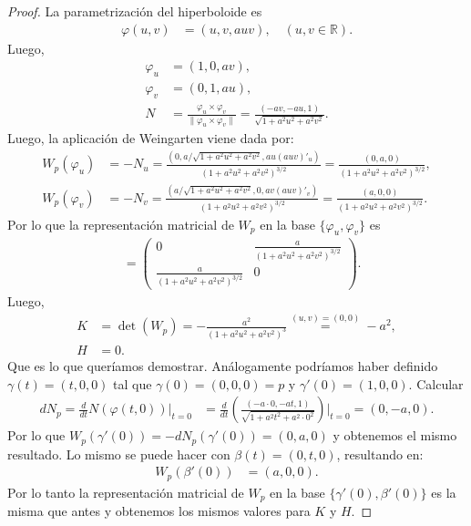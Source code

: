 \documentclass{article}
\newcommand{\R}{\mathbb{R}}
\begin{document}
\begin{proof}
    La parametrización del hiperboloide es \begin{align*}
        \varphi(u, v) & = (u, v, auv), \quad (u, v \in \R).
    \end{align*}
    Luego, \begin{align*}
        \varphi_u & = (1, 0, av),                                                                                                           \\
        \varphi_v & = (0, 1, au),                                                                                                           \\
        N         & = \frac{\varphi_u \times \varphi_v}{\|\varphi_u \times \varphi_v\|} = \frac{(-av, -au, 1)}{\sqrt{1 + a^2u^2 + a^2v^2}}.
    \end{align*}
    Luego, la aplicación de Weingarten viene dada por: \begin{align*}
        W_p(\varphi_u) & = -N_u = \frac{(0, a/\sqrt{1 + a^2u^2 + a^2v^2}, au(auv)'_u)}{(1 + a^2u^2 + a^2v^2)^{3/2}} = \frac{(0, a, 0)}{{(1 + a^2u^2 + a^2v^2)}^{3/2}}, \\
        W_p(\varphi_v) & = -N_v = \frac{(a/\sqrt{1 + a^2u^2 + a^2v^2}, 0, av(auv)'_v)}{(1 + a^2u^2 + a^2v^2)^{3/2}} = \frac{(a, 0, 0)}{{(1 + a^2u^2 + a^2v^2)}^{3/2}}.
    \end{align*}
    Por lo que la representación matricial de \( W_p \) en la base \( \{\varphi_u, \varphi_v\} \) es \begin{align*}
        [W_p] & = \begin{pmatrix}
                      0                                       & \frac{a}{{(1 + a^2u^2 + a^2v^2)}^{3/2}} \\
                      \frac{a}{{(1 + a^2u^2 + a^2v^2)}^{3/2}} & 0
                  \end{pmatrix}.
    \end{align*}
    Luego, \begin{align*}
        K & = \det(W_p) = -\frac{a^2}{{(1 + a^2u^2 + a^2v^2)}^{3}} \stackrel{(u,v)=(0,0)}{=} -a^2, \\
        H & = 0.
    \end{align*}
    Que es lo que queríamos demostrar. Análogamente podríamos haber definido \( \gamma(t) = (t, 0, 0) \) tal que \( \gamma(0) = (0, 0, 0) = p \) y \( \gamma'(0) = (1, 0, 0) \). Calcular \begin{align*}
        dN_{p} = \frac{d}{dt}N(\varphi(t, 0)) \Big|_{t=0} & = \frac{d}{dt}\left(\frac{(-a \cdot 0, -a t, 1)}{\sqrt{1 + a^2 t^2 + a^2 \cdot 0^2}}\right) \Big|_{t=0} = (0, -a, 0).
    \end{align*}
    Por lo que \( W_p(\gamma'(0)) = -dN_p(\gamma'(0)) = (0, a, 0) \) y obtenemos el mismo resultado. Lo mismo se puede hacer con \( \beta(t) = (0, t, 0) \), resultando en: \begin{align*}
        W_p(\beta'(0)) & = (a, 0, 0).
    \end{align*}
    Por lo tanto la representación matricial de \( W_p \) en la base \( \{\gamma'(0), \beta'(0)\} \) es la misma que antes y obtenemos los mismos valores para \( K \) y \( H \).
\end{proof}
\end{document}
